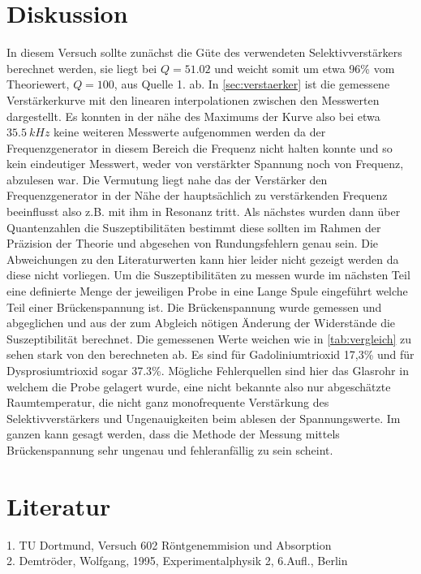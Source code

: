 \section{Diskussion} %
\label{sec:Diskussion}
In diesem Versuch sollte zunächst die Güte des verwendeten Selektivverstärkers berechnet werden,
sie liegt bei $Q=51.02$ und weicht somit um etwa 96\% vom Theoriewert, $Q=100$, aus Quelle 1. ab. In
\autoref{sec:verstaerker} ist die gemessene Verstärkerkurve mit den linearen interpolationen 
zwischen den Messwerten dargestellt. Es konnten
in der nähe des Maximums der Kurve also bei etwa $\SI[]{35.5}[]{kHz}$ keine weiteren Messwerte aufgenommen werden
da der Frequenzgenerator in diesem Bereich die Frequenz nicht halten konnte und so kein eindeutiger 
Messwert, weder von verstärkter Spannung noch von Frequenz, abzulesen war. Die Vermutung liegt nahe das
der Verstärker den Frequenzgenerator in der Nähe der hauptsächlich zu verstärkenden Frequenz beeinflusst
also z.B. mit ihm in Resonanz tritt. Als nächstes wurden dann über Quantenzahlen die Suszeptibilitäten 
bestimmt diese sollten im Rahmen der Präzision der Theorie und abgesehen von Rundungsfehlern genau sein. Die
Abweichungen zu den Literaturwerten kann hier leider nicht gezeigt werden da diese nicht vorliegen.
Um die Suszeptibilitäten zu messen wurde im nächsten Teil eine definierte Menge 
der jeweiligen Probe in eine Lange Spule eingeführt welche Teil einer Brückenspannung
ist. Die Brückenspannung wurde gemessen und abgeglichen und aus der zum Abgleich nötigen Änderung der Widerstände
die Suszeptibilität berechnet. Die gemessenen Werte weichen wie in \autoref{tab:vergleich} zu sehen stark von den berechneten ab.
Es sind für  Gadoliniumtrioxid 17,3\% und für Dysprosiumtrioxid sogar 37.3\%. 
Mögliche Fehlerquellen sind hier das Glasrohr in welchem die Probe gelagert wurde,
eine nicht bekannte also nur abgeschätzte Raumtemperatur, die nicht ganz monofrequente Verstärkung des Selektivverstärkers
und Ungenauigkeiten beim ablesen der Spannungswerte.
Im ganzen kann gesagt werden, dass die Methode der Messung mittels Brückenspannung sehr ungenau und fehleranfällig zu sein scheint.
\section{Literatur}
\label{Literatur}
1. TU Dortmund, Versuch 602 Röntgenemmision und Absorption\\
2. Demtröder, Wolfgang, 1995, Experimentalphysik 2, 6.Aufl., Berlin\\
